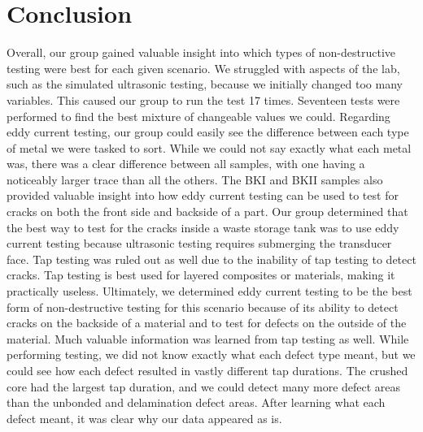 \documentclass[12 pt]{report}
\begin{document}
\section{Conclusion} \label{conclusion-section}
Overall, our group gained valuable insight into which types of non-destructive testing were best for each given scenario. We struggled with aspects of the lab, such as the simulated ultrasonic testing, because we initially changed too many variables. This caused our group to run the test \num{17} times. Seventeen tests were performed to find the best mixture of changeable values we could. Regarding eddy current testing, our group could easily see the difference between each type of metal we were tasked to sort. While we could not say exactly what each metal was, there was a clear difference between all samples, with one having a noticeably larger trace than all the others. The BKI and BKII samples also provided valuable insight into how eddy current testing can be used to test for cracks on both the front side and backside of a part. Our group determined that the best way to test for the cracks inside a waste storage tank was to use eddy current testing because ultrasonic testing requires submerging the transducer face. Tap testing was ruled out as well due to the inability of tap testing to detect cracks. Tap testing is best used for layered composites or materials, making it practically useless. Ultimately, we determined eddy current testing to be the best form of non-destructive testing for this scenario because of its ability to detect cracks on the backside of a material and to test for defects on the outside of the material. Much valuable information was learned from tap testing as well. While performing testing, we did not know exactly what each defect type meant, but we could see how each defect resulted in vastly different tap durations. The crushed core had the largest tap duration, and we could detect many more defect areas than the unbonded and delamination defect areas. After learning what each defect meant, it was clear why our data appeared as is.

\printbibliography[heading=subbibintoc]
\appendix
\end{document}
